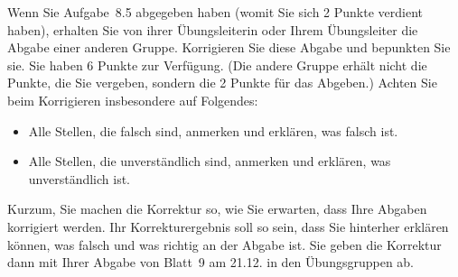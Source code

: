 \begin{aufg}
Wenn Sie Aufgabe~8.5 abgegeben haben (womit Sie sich 2 Punkte verdient haben), erhalten Sie von ihrer \"Ubungsleiterin oder Ihrem \"Ubungsleiter die Abgabe einer anderen Gruppe. Korrigieren Sie diese Abgabe und bepunkten Sie sie. Sie haben 6 Punkte zur Verf\"ugung. (Die andere Gruppe erh\"alt nicht die Punkte, die Sie vergeben, sondern die 2 Punkte f\"ur das Abgeben.) Achten Sie beim Korrigieren insbesondere auf Folgendes: 
\begin{itemize}
 \item Alle Stellen, die falsch sind, anmerken und erkl\"aren, was falsch ist.
 \item Alle Stellen, die unverst\"andlich sind, anmerken und erkl\"aren, was unverst\"andlich ist.
\end{itemize}
Kurzum, Sie machen die Korrektur so, wie Sie erwarten, dass Ihre Abgaben korrigiert werden. Ihr Korrekturergebnis soll so sein, dass Sie hinterher erkl\"aren k\"onnen, was falsch und was richtig an der Abgabe ist. Sie geben die Korrektur dann mit Ihrer Abgabe von Blatt~9 am 21.12. in den \"Ubungsgruppen ab.
\end{aufg}

